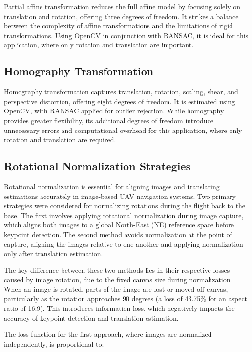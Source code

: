Partial affine transformation reduces the full affine model by focusing solely on translation and rotation, offering three degrees of freedom. It strikes a balance between the complexity of affine transformations and the limitations of rigid transformations. Using OpenCV in conjunction with RANSAC, it is ideal for this application, where only rotation and translation are important. \cite{opencv_warp_affine}

\subsection{Homography Transformation}

Homography transformation captures translation, rotation, scaling, shear, and perspective distortion, offering eight degrees of freedom. It is estimated using OpenCV, with RANSAC applied for outlier rejection. While homography provides greater flexibility, its additional degrees of freedom introduce unnecessary errors and computational overhead for this application, where only rotation and translation are required. \cite{opencv_homography}




\subsection*{Rotational Normalization Strategies}

Rotational normalization is essential for aligning images and translating estimations accurately in image-based UAV navigation systems. Two primary strategies were considered for normalizing rotations during the flight back to the base. The first involves applying rotational normalization during image capture, which aligns both images to a global North-East (NE) reference space before keypoint detection. The second method avoids normalization at the point of capture, aligning the images relative to one another and applying normalization only after translation estimation.

The key difference between these two methods lies in their respective losses caused by image rotation, due to the fixed canvas size during normalization. When an image is rotated, parts of the image are lost or moved off-canvas, particularly as the rotation approaches 90 degrees (a loss of 43.75\% for an aspect ratio of 16:9). This introduces information loss, which negatively impacts the accuracy of keypoint detection and translation estimation.

The loss function for the first approach, where images are normalized independently, is proportional to:

